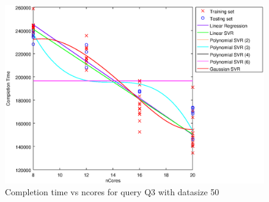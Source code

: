 
\begin {figure}[hbtp]
\centering
\includegraphics[width=\textwidth]{output/Q3_50_ONLY_NCORES/plot_Q3_50.eps}
\caption{Completion time vs ncores for query Q3 with datasize 50}
\label{fig:all_linear_Q3_50}
\end {figure}
